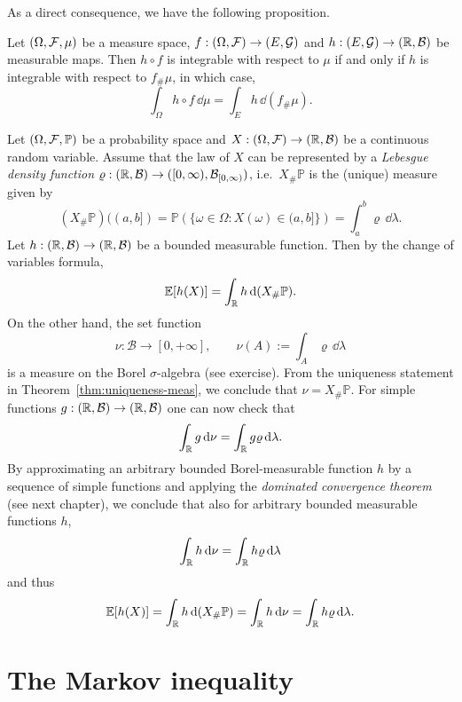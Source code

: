 \bigskip

As a direct consequence, we have the following proposition.
\begin{proposition}
Let $(\Omega, \mathcal F, \mu)$ be a measure space, $f: (\Omega, \mathcal F) \to (E, \mathcal{G})$ and $h: (E, \mathcal{G}) \to (\mathbb R,\mathcal{B})$ be measurable maps. Then $h \circ f$ is integrable with respect to $\mu$ if and only if $h$ is integrable with respect to $f_\# \mu$, in which case,
\[
\int_\Omega h \circ f\, \dd \mu = \int_E h \, \dd (f_\# \mu).
\]
\end{proposition}

\begin{example}
Let $(\Omega, \mathcal F, \mathbb{P})$ be a probability space and $X: (\Omega, \mathcal F) \to (\mathbb R, \mathcal{B})$ be a continuous random variable. Assume that the law of $X$ can be represented by a \emph{Lebesgue density function} $\varrho: (\mathbb R, \mathcal{B}) \to ([0,\infty), \mathcal{B}_{[0,\infty)})$, i.e.\ $X_\# \mathbb{P}$ is the (unique) measure given by
\[
(X_\# \mathbb{P})((a,b]) =\mathbb{P}\left(\bigl\{ \omega \in \Omega : X(\omega) \in (a,b]\bigr\} \right) = 
\int_a^b \varrho \, \dd \lambda.
\]	
Let $h : (\mathbb R, \mathcal{B}) \to (\mathbb R, \mathcal{B})$ be a bounded measurable function. Then by the change of variables formula,
\[
	\mathbb{E}[h(X)] = \int_{\mathbb R} h \, \mathrm{d} (X_\# \mathbb{P}).
\]
On the other hand, the set function
\[
	\nu: \mathcal{B} \to [0,+\infty],\qquad\nu(A) := \int_A \varrho\, \dd \lambda
\]
is a measure on the Borel $\sigma$-algebra (see exercise). From the uniqueness statement in Theorem~\ref{thm:uniqueness-meas}, we conclude that $\nu = X_\# \mathbb{P}$. For simple functions $g:(\mathbb R, \mathcal{B}) \to (\mathbb R, \mathcal{B})$ one can now check that
\[
\int_{\mathbb R} g\, \mathrm{d} \nu = \int_{\mathbb R} g \varrho\, \mathrm{d} \lambda.
\]
By approximating an arbitrary bounded Borel-measurable function $h$ by a sequence of simple functions and applying the \emph{dominated convergence theorem} (see next chapter), we conclude that also for arbitrary bounded measurable functions $h$,
\[
\int_{\mathbb R} h\, \mathrm{d} \nu = \int_{\mathbb R} h \varrho\, \mathrm{d} \lambda
\]
and thus
\[
\mathbb{E}[h(X)] = \int_{\mathbb R} h \, \mathrm{d} (X_\# \mathbb{P}) = \int_{\mathbb R} h \, \mathrm{d} \nu = \int_{\mathbb R} h \varrho \, \mathrm{d} \lambda.
\]
\end{example}


\section{The Markov inequality}

